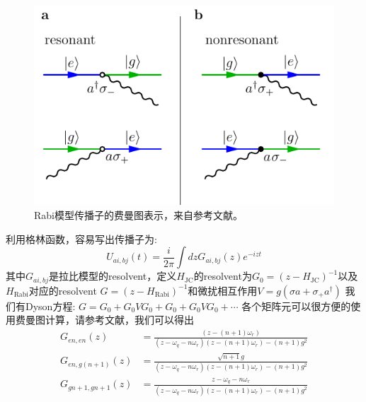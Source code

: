 \documentclass[supercite]{HustGraduPaper}
\begin{document}
\begin{figure}
	\centering
	\includegraphics[width=0.7\linewidth]{Figures/Feynman/FigFourVerticesRabi}
	\caption{Rabi模型传播子的费曼图表示，来自参考文献\cite{di2017feynman}。}
	\label{fig:figfourverticesrabi}
\end{figure}
利用格林函数，容易写出传播子为:
\begin{equation}
U_{ai, bj} (t)= \frac{i}{2\pi} \int dz G_{ai,bj} (z) e^{-izt}
\end{equation}
其中$G_{ai,bj}$是拉比模型的resolvent，定义$H_{\text{JC}}$的resolvent为$G_0 = (z- H_{\text{JC}})^{-1}$以及$H_{\text{Rabi}}$对应的resolvent $G = (z- H_{\text{Rabi}})^{-1}$和微扰相互作用$V = g( \sigma a+ \sigma_+ a^\dagger)$
我们有Dyson方程:
$G = G_0 + G_0 VG_0 + G_0 + G_0 V G_0 + \cdots$
各个矩阵元可以很方便的使用费曼图计算，请参考文献\cite{di2017feynman}，我们可以得出
\begin{equation}
\begin{aligned}
{G_{en,en}}\left( z \right) &= \frac{{\left( {z - \left( {n + 1} \right)\omega_r } \right)}}{{\left( {z - \omega_q  - n\omega_r } \right)\left( {z - \left( {n + 1} \right)\omega_r } \right) - \left( {n + 1} \right){g^2}}}\\
{G_{en,g\left( {n + 1} \right)}}\left( z \right) &= \frac{{\sqrt {n + 1} g}}{{\left( {z - \omega_q  - n\omega_r } \right)\left( {z - \left( {n + 1} \right)\omega_r } \right) - \left( {n + 1} \right){g^2}}}\\
{G_{gn + 1,gn + 1}}\left( z \right) &= \frac{{z - \omega_q - n\omega_r }}{{\left( {z - \omega_q  - n\omega_r } \right)\left( {z - \left( {n + 1} \right)\omega_r } \right) - \left( {n + 1} \right){g^2}}}
\end{aligned}
\end{equation}
\end{document}
